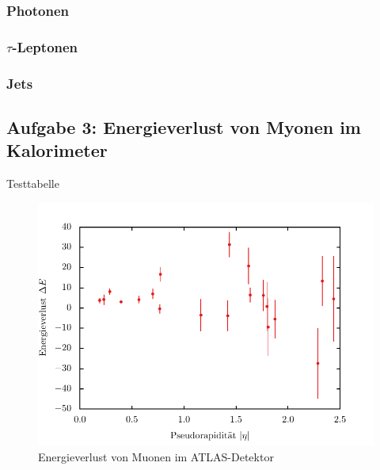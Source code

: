 \documentclass[11pt, a4paper]{article}
\numberwithin{equation}{section}
\begin{document}
\subsubsection{Photonen}

\subsubsection{$\tau$-Leptonen}

\subsubsection{Jets}

\subsection{Aufgabe 3: Energieverlust von Myonen im Kalorimeter}

\begin{table}[h]
	\centering
	
	\caption{Testtabelle}
\end{table}

\begin{figure}[h]
	\centering
	\includegraphics{./figures/muon_energy_loss/eta.pdf}
	\caption{Energieverlust von Muonen im ATLAS-Detektor}
\end{figure}
\end{document}
